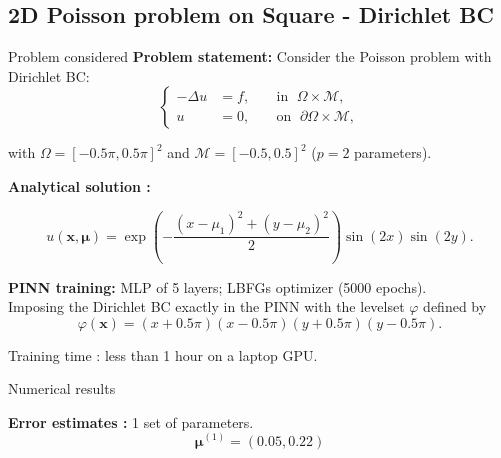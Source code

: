 \subsection{2D Poisson problem on Square - Dirichlet BC}

\begin{frame}{Problem considered} 
	\textbf{Problem statement:} Consider the Poisson problem with Dirichlet BC:
	\vspace{-5pt}
	\begin{equation*}
		\left\{
		\begin{aligned}
			-\Delta u & = f, \; &  & \text{in } \; \Omega \times \mathcal{M}, \\
			u         & =0, \;  &  & \text{on } \; \partial\Omega \times \mathcal{M},
		\end{aligned}
		\right.
	\end{equation*}

	\vspace{-5pt}
	with $\Omega=[-0.5 \pi, 0.5 \pi]^2$ and $\mathcal{M}=[-0.5,0.5]^2$ ($p=2$ parameters).
		
	\vspace{8pt}
	\textbf{Analytical solution :}

	\vspace{-5pt}
	\begin{equation*}
		u(\bm{x},\bm{\mu})=\exp\left(-\frac{(x-\mu_1)^2+(y-\mu_2)^2}{2}\right)\sin(2 x)\sin(2 y).
	\end{equation*}

	\vspace{12pt}
	\textbf{PINN training:} MLP of 5 layers; LBFGs optimizer (5000 epochs). \\
	Imposing the Dirichlet BC exactly in the PINN with the levelset $\varphi$ defined by
	$$\varphi(\bm{x})=(x+0.5\pi)(x-0.5\pi)(y+0.5\pi)(y-0.5\pi).$$
	
	\small\vspace{4pt}
	Training time : less than 1 hour on a laptop GPU.
\end{frame}

\begin{frame}{Numerical results}
	\hspace{-5pt}\begin{minipage}[t]{0.46\linewidth}
		\textbf{Error estimates :} 1 set of parameters.
		$$\bm{\mu}^{(1)}=(0.05, 0.22) $$
		\vspace{-35pt}
		\begin{figure}[H]
		\end{figure}
	\end{minipage} \qquad \small
	\begin{minipage}[t]{0.48\linewidth}
	\end{minipage}
\end{frame}

